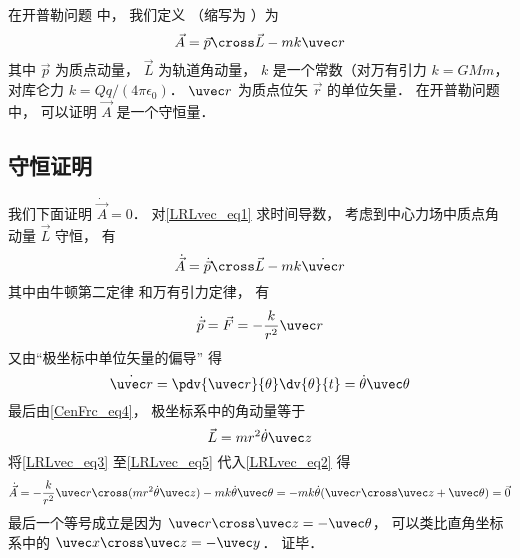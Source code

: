 

在开普勒问题%
中， 我们定义 （缩写为 ）为
\begin{equation}\label{LRLvec_eq1}
\vec A = \vec p \cross \vec L - mk \uvec r
\end{equation}
其中 $\vec p$ 为质点动量， $\vec L$ 为轨道角动量， $k$ 是一个常数（对万有引力 $k = GMm$， 对库仑力 $k = Qq/(4\pi\epsilon_0)$． $\uvec r$ 为质点位矢 $\vec r$ 的单位矢量． 在开普勒问题%
中， 可以证明 $\vec A$ 是一个守恒量．

\subsection{守恒证明}
我们下面证明 $\dot{\vec A} = 0$． 对\autoref{LRLvec_eq1} 求时间导数， 考虑到中心力场中质点角动量 $\vec L$ 守恒， 有
\begin{equation}\label{LRLvec_eq2}
\dot{\vec A} = \dot{\vec p}\cross \vec L  - mk\dot{\uvec r}
\end{equation}
其中由牛顿第二定律 和万有引力定律， 有
\begin{equation}\label{LRLvec_eq3}
\dot{\vec p} = \vec F = - \frac{k}{r^2}\uvec r
\end{equation}
又由“极坐标中单位矢量的偏导” 得
\begin{equation}\label{LRLvec_eq4}
\dot{\uvec r} = \pdv{\uvec r}{\theta} \dv{\theta}{t} = \dot\theta\uvec \theta
\end{equation}
最后由\autoref{CenFrc_eq4}， 极坐标系中的角动量等于
\begin{equation}\label{LRLvec_eq5}
\vec L = mr^2\dot \theta \uvec z
\end{equation}
将\autoref{LRLvec_eq3} 至\autoref{LRLvec_eq5} 代入\autoref{LRLvec_eq2} 得
\begin{equation}
\dot{\vec A} = -\frac{k}{r^2}\uvec r \cross (mr^2\dot\theta\uvec z) - mk\dot\theta\uvec\theta
=-mk\dot\theta (\uvec r\cross \uvec z + \uvec \theta)
= \vec 0
\end{equation}
最后一个等号成立是因为 $\uvec r\cross\uvec z = -\uvec\theta$， 可以类比直角坐标系中的 $\uvec x\cross\uvec z = -\uvec y$． 证毕．


